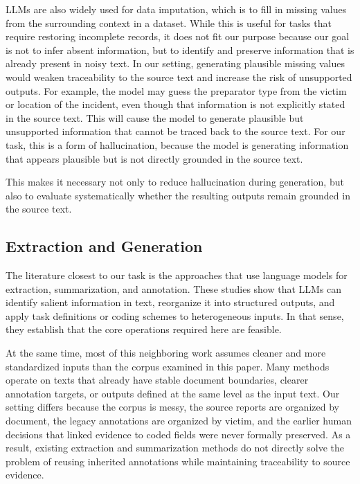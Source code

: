 \documentclass{article}
\begin{document}
LLMs are also widely used for data imputation, which is to fill in missing values from the surrounding context in a dataset. While this is useful for tasks that require restoring incomplete records, it does not fit our purpose because our goal is not to infer absent information, but to identify and preserve information that is already present in noisy text. In our setting, generating plausible missing values would weaken traceability to the source text and increase the risk of unsupported outputs. For example, the model may guess the preparator type from the victim or location of the incident, even though that information is not explicitly stated in the source text. This will cause the model to generate plausible but unsupported information that cannot be traced back to the source text. For our task, this is a form of hallucination, because the model is generating information that appears plausible but is not directly grounded in the source text.

This makes it necessary not only to reduce hallucination during generation, but also to evaluate systematically whether the resulting outputs remain grounded in the source text.

\subsection{Extraction and
Generation}\label{extraction-and-summarization}

The literature closest to our task is the approaches that use language models for extraction, summarization, and annotation. These studies show that LLMs can identify salient information in text, reorganize it into structured outputs, and apply task definitions or coding schemes to heterogeneous inputs. In that sense, they establish that the core operations required here are feasible.

At the same time, most of this neighboring work assumes cleaner and more standardized inputs than the corpus examined in this paper. Many methods operate on texts that already have stable document boundaries, clearer annotation targets, or outputs defined at the same level as the input text. Our setting differs because the corpus is messy, the source reports are organized by document, the legacy annotations are organized by victim, and the earlier human decisions that linked evidence to coded fields were never formally preserved. As a result, existing extraction and summarization methods do not directly solve the problem of reusing inherited annotations while maintaining traceability to source evidence.
\end{document}
